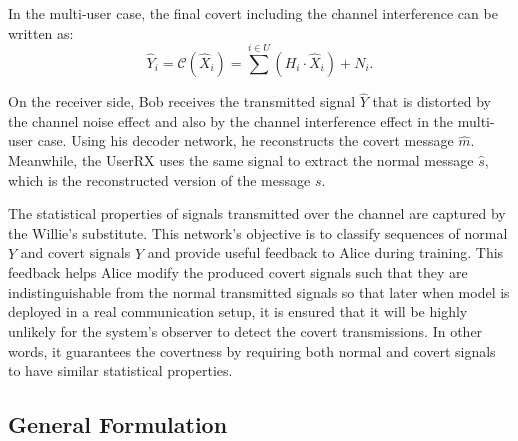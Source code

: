 In the multi-user case, the final covert including the channel interference can be written as:
\begin{equation}
	\hat{Y}_i = \mathcal{C}(\hat{X}_i) = \sum^{i \in U}(H_i \cdot \hat{X}_i) + N_i.
\end{equation}


On the receiver side, Bob receives the transmitted signal \(\hat{Y}\) that is distorted by the channel noise effect and also by the channel interference effect in the multi-user case. Using his decoder network, he reconstructs the covert message \(\hat{m}\). Meanwhile, the UserRX uses the same signal to extract the normal message \(\hat{s}\), which is the reconstructed version of the message \(s\).


The statistical properties of signals transmitted over the channel are captured by the Willie's substitute. This network's objective is to classify sequences of normal \(Y\) and covert signals \(\hat{Y}\) and provide useful feedback to Alice during training. This feedback helps Alice modify the produced covert signals such that they are indistinguishable from the normal transmitted signals so that later when model is deployed in a real communication setup, it is ensured that it will be highly unlikely for the system's observer to detect the covert transmissions. In other words, it guarantees the covertness by requiring both normal and covert signals to have similar statistical properties.

\subsection{General Formulation}

